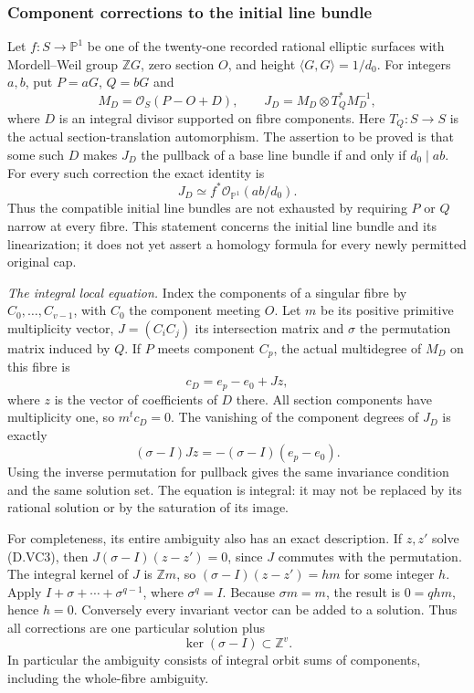 \subsubsection*{Component corrections to the initial line bundle}
Let $f:S\to\mathbb P^1$ be one of the twenty-one recorded
rational elliptic surfaces with Mordell--Weil group $\mathbb ZG$,
zero section $O$, and height $\langle G,G\rangle=1/d_0$.
For integers $a,b$, put $P=aG$, $Q=bG$ and
\[
 M_D=\mathcal O_S(P-O+D),\qquad
 J_D=M_D\otimes T_Q^*M_D^{-1},
\]
where $D$ is an integral divisor supported on fibre components.
Here $T_Q:S\to S$ is the actual section-translation automorphism.
The assertion to be proved is that some such $D$ makes
$J_D$ the pullback of a base line bundle if and only if
$d_0\mid ab$. For every such correction the exact identity is
\[
                  J_D\simeq f^*\mathcal O_{\mathbb P^1}(ab/d_0).
                                                        \tag{D.VC1}
\]
Thus the compatible initial line bundles are not exhausted
by requiring $P$ or $Q$ narrow at every fibre.
This statement concerns the initial line bundle and its
linearization; it does not yet assert a homology formula
for every newly permitted original cap.

\emph{The integral local equation.}
Index the components of a singular fibre by $C_0,\ldots,C_{v-1}$,
with $C_0$ the component meeting $O$. Let $m$ be its positive
primitive multiplicity vector, $J=(C_iC_j)$ its intersection
matrix and $\sigma$ the permutation matrix induced by $Q$.
If $P$ meets component $C_p$, the actual multidegree of
$M_D$ on this fibre is
\[
                    c_D=e_p-e_0+Jz,
                                                        \tag{D.VC2}
\]
where $z$ is the vector of coefficients of $D$ there.
All section components have multiplicity one, so $m^tc_D=0$.
The vanishing of the component degrees of $J_D$ is exactly
\[
                 (\sigma-I)Jz=-(\sigma-I)(e_p-e_0).
                                                        \tag{D.VC3}
\]
Using the inverse permutation for pullback gives the same
invariance condition and the same solution set.
The equation is integral: it may not be replaced by its
rational solution or by the saturation of its image.

For completeness, its entire ambiguity also has an exact
description. If $z,z'$ solve (D.VC3), then
$J(\sigma-I)(z-z')=0$, since $J$ commutes with the permutation.
The integral kernel of $J$ is $\mathbb Zm$, so
$(\sigma-I)(z-z')=h m$ for some integer $h$.
Apply $I+\sigma+\cdots+\sigma^{q-1}$, where $\sigma^q=I$.
Because $\sigma m=m$, the result is $0=qh m$, hence $h=0$.
Conversely every invariant vector can be added to a solution.
Thus all corrections are one particular solution plus
\[
                         \ker(\sigma-I)\subset\mathbb Z^v.
                                                        \tag{D.VC4}
\]
In particular the ambiguity consists of integral orbit sums
of components, including the whole-fibre ambiguity.

